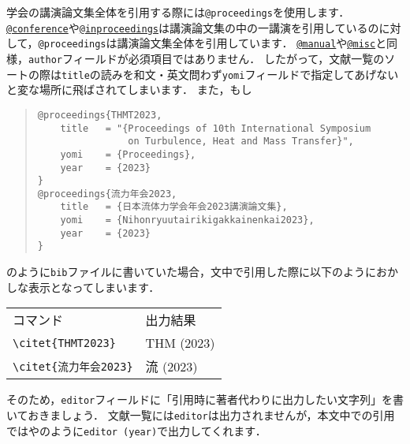 \documentclass[a4paper,fleqn,uplatex,dvipdfmx]{jsarticle}
\makeatletter
\newcommand{\ttconference}{\texttt{@conference}}
\newcommand{\ttinproceedings}{\texttt{@inproceedings}}
\newcommand{\ttmanual}{\texttt{@manual}}
\newcommand{\ttmisc}{\texttt{@misc}}
\newcommand{\ttproceedings}{\texttt{@proceedings}}
\makeatother
\begin{document}
学会の講演論文集全体を引用する際には\ttproceedings を使用します．
\hyperref[ssec:conference]{\ttconference}や\hyperref[ssec:inproceedings]{\ttinproceedings}は講演論文集の中の一講演を引用しているのに対して，\ttproceedings は講演論文集全体を引用しています．
\hyperref[ssec:manual]{\ttmanual}や\hyperref[ssec:misc]{\ttmisc}と同様，\verb|author|フィールドが必須項目ではありません．
したがって，文献一覧のソートの際は\verb|title|の読みを和文・英文問わず\verb|yomi|フィールドで指定してあげないと変な場所に飛ばされてしまいます．
また，もし
\begin{quote}
\begin{verbatim}
@proceedings{THMT2023,
    title   = "{Proceedings of 10th International Symposium 
                on Turbulence, Heat and Mass Transfer}",
    yomi    = {Proceedings},
    year    = {2023}
}
@proceedings{流力年会2023,
    title   = {日本流体力学会年会2023講演論文集},
    yomi    = {Nihonryuutairikigakkainenkai2023},
    year    = {2023}
}
\end{verbatim}
\end{quote}
のように\verb|bib|ファイルに書いていた場合，文中で引用した際に以下のようにおかしな表示となってしまいます．
\begin{table}[h]
    \centering
    \begin{tabular}{ll}
        コマンド    &出力結果 \\
        \verb|\citet{THMT2023}| &THM (2023) \\
        \verb|\citet{流力年会2023}| &流 (2023) \\
    \end{tabular}
\end{table}
そのため，\verb|editor|フィールドに「引用時に著者代わりに出力したい文字列」を書いておきましょう．
文献一覧には\verb|editor|は出力されませんが，本文中での引用では\citet{THMT2023}や\citet{流力年会2023}のように\verb|editor (year)|で出力してくれます．
\end{document}
